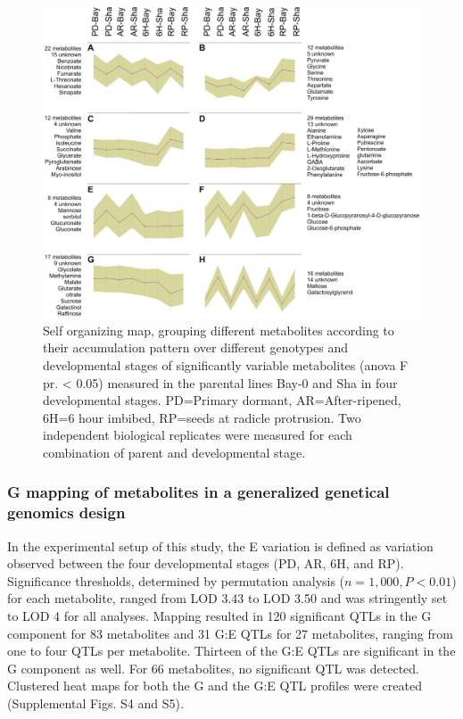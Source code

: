 \begin{figure}[h!]
  \centering
  \includegraphics[keepaspectratio,scale=0.30]{eps/image_3_2_1.eps}
  \caption[Self organizing map]{Self organizing map, grouping different metabolites according to their accumulation pattern over different 
    genotypes and developmental stages of significantly variable metabolites (anova F pr. < 0.05)  measured in the parental lines Bay-0 
    and Sha in four developmental stages.  PD=Primary dormant, AR=After-ripened, 6H=6 hour imbibed, RP=seeds at radicle protrusion. Two
    independent biological replicates were measured for each combination of parent and developmental stage.}
\end{figure}

\subsubsection{G mapping of metabolites in a generalized genetical genomics design}
In the experimental setup of this study, the E variation is defined as variation observed between the four
developmental stages (PD, AR, 6H, and RP). Significance thresholds, determined by permutation analysis
($n = 1,000, P < 0.01$) for each metabolite, ranged from LOD 3.43 to LOD 3.50 and was stringently set to 
LOD 4 for all analyses. Mapping resulted in 120 significant QTLs in the G component for 83 metabolites and 
31 G:E QTLs for 27 metabolites, ranging from one to four QTLs per metabolite. Thirteen of the G:E QTLs are
significant in the G component as well. For 66 metabolites, no significant QTL was detected. Clustered 
heat maps for both the G and the G:E QTL profiles were created (Supplemental Figs. S4 and S5).

